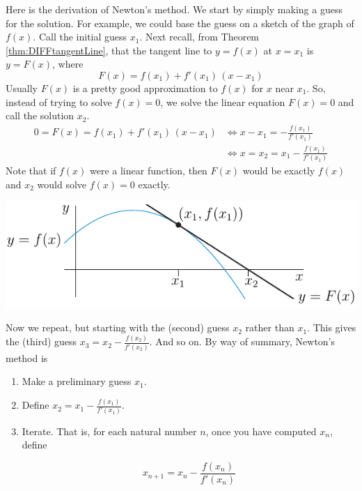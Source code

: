 Here is the derivation of Newton's method. We start by simply making a
guess for the solution. For example, we could base the guess on a sketch
of the graph of $f(x)$. Call the initial guess $x_1$. 
Next recall, from Theorem \ref{thm:DIFFtangentLine}, that the tangent 
line to $y=f(x)$ at $x=x_1$ is $y=F(x)$, where
\begin{equation*}
F(x) = f(x_1) + f'(x_1)\,(x-x_1)
\end{equation*}
Usually $F(x)$ is a pretty good approximation to $f(x)$ for $x$ near $x_1$. 
So, instead of trying to solve $f(x)=0$, we solve the linear equation
$F(x)=0$ and call the solution $x_2$.
\begin{align*}
0=F(x)=f(x_1) + f'(x_1)\,(x-x_1)
&\iff x-x_1=-\frac{f(x_1)}{f'(x_1)} \\
&\iff x= x_2= x_1 -\frac{f(x_1)}{f'(x_1)}
\end{align*}
Note that if $f(x)$ were a linear function, then $F(x)$ would be exactly $f(x)$
and $x_2$ would solve $f(x)=0$ exactly.
\begin{efig}
\begin{center}
   \includegraphics{NewtonM}
\end{center}
\end{efig}

Now we repeat, but starting with the (second) guess $x_2$ rather than $x_1$.
This gives the (third) guess $x_3= x_2 -\frac{f(x_2)}{f'(x_2)}$. And so
on. By way of summary, Newton's method is
\begin{enumerate}
\item Make a preliminary guess $x_1$.
\item Define $x_2=x_1-\frac{f(x_1)}{f'(x_1)}$.
\item Iterate. That is, for each natural number $n$,
    once you have computed $x_n$, define 
   \begin{impeqn}\label{eq:APPnewton}
  \begin{equation*}
    x_{n+1}=x_n-\frac{f(x_n)}{f'(x_n)}
  \end{equation*}
  \end{impeqn}
\end{enumerate}

